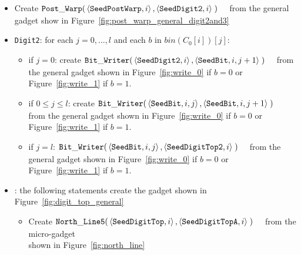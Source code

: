 \begin{itemize}
    \item Create
    $\begin{aligned}[t]
        {\tt Post\_Warp}(&\left\langle {\tt SeedPostWarp},   i \right\rangle,
                   \left\langle {\tt SeedDigit2},   i \right\rangle \;)
    \end{aligned}$ from the general gadget show in Figure~\ref{fig:post_warp_general_digit2and3}

    \item {\tt Digit2}: for each $j=0,\ldots,l$ and each $b$ in $bin(C_0[i])[j]$:
    \begin{itemize}
        \item if $j = 0$: create
        $\begin{aligned}[t]
            {\tt Bit\_Writer}(&\left\langle {\tt SeedDigit2}, i \right\rangle, \left\langle {\tt SeedBit}, i, j + 1 \right\rangle \;)
        \end{aligned}$ from the general gadget shown in Figure~\ref{fig:write_0} if $b = 0$ or Figure~\ref{fig:write_1} if $b = 1$.

        \item if $0 \leqslant j \leqslant l$: create
        $\begin{aligned}[t]
            {\tt Bit\_Writer}(&\left\langle {\tt SeedBit}, i, j \right\rangle, \left\langle {\tt SeedBit}, i, j + 1 \right\rangle \;)
        \end{aligned}$ from the general gadget shown in Figure~\ref{fig:write_0} if $b = 0$ or Figure~\ref{fig:write_1} if $b = 1$.

        \item if $j = l$:
        $\begin{aligned}[t]
            {\tt Bit\_Writer}(&\left\langle {\tt SeedBit}, i, j \right\rangle, \left\langle {\tt SeedDigitTop2}, i \right\rangle \;)
        \end{aligned}$ from the general gadget shown in Figure~\ref{fig:write_0} if $b = 0$ or Figure~\ref{fig:write_1} if $b = 1$.
    \end{itemize}


    \item {\dtop}: the following statements create the gadget shown in Figure~\ref{fig:digit_top_general}
    \begin{itemize}
        \item Create
        $\begin{aligned}[t]
            {\tt North\_Line5}(& \left \langle {\tt SeedDigitTop},  i \right\rangle,
                                 \left \langle {\tt SeedDigitTopA}, i \right\rangle \;)
        \end{aligned}$ from the micro-gadget\\shown in Figure~\ref{fig:north_line}


\end{itemize}
\end{itemize}
